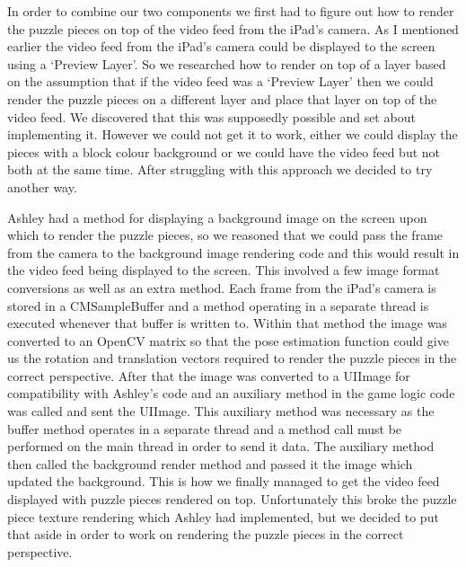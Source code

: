 \documentclass{article}
\begin{document}
In order to combine our two components we first had to figure out how to render the puzzle pieces on top of the video feed from the iPad's camera. As I mentioned earlier the video feed from the iPad's camera could be displayed to the screen using a `Preview Layer'. So we researched how to render on top of a layer based on the assumption that if the video feed was a `Preview Layer' then we could render the puzzle pieces on a different layer and place that layer on top of the video feed. We discovered that this was supposedly possible and set about implementing it. However we could not get it to work, either we could display the pieces with a block colour background or we could have the video feed but not both at the same time. After struggling with this approach we decided to try another way.

Ashley had a method for displaying a background image on the screen upon which to render the puzzle pieces, so we reasoned that we could pass the frame from the camera to the background image rendering code and this would result in the video feed being displayed to the screen. This involved a few image format conversions as well as an extra method.
Each frame from the iPad's camera is stored in a CMSampleBuffer and a method operating in a separate thread is executed whenever that buffer is written to. Within that method the image was converted to an OpenCV matrix so that the pose estimation function could give us the rotation and translation vectors required to render the puzzle pieces in the correct perspective. %
 After that the image was converted to a UIImage for compatibility with Ashley's code and an auxiliary method in the game logic code was called and sent the UIImage. This auxiliary method was necessary as the buffer method operates in a separate thread and a method call must be performed on the main thread in order to send it data. The auxiliary method then called the background render method and passed it the image which updated the background. This is how we finally managed to get the video feed displayed with puzzle pieces rendered on top. Unfortunately this broke the puzzle piece texture rendering which Ashley had implemented, but we decided to put that aside in order to work on rendering the puzzle pieces in the correct perspective.
\end{document}
